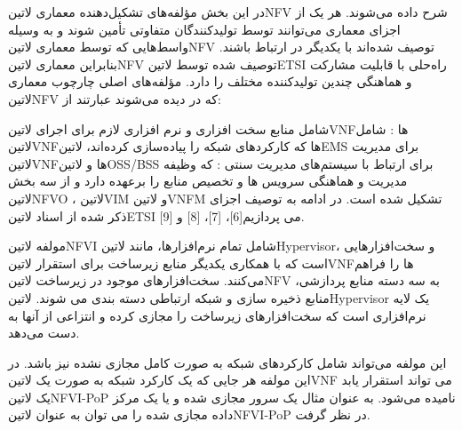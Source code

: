 \documentclass{book}
\begin{document}

در این بخش مؤلفه‌های تشکیل‌دهنده معماری ‌لاتین{NFV} شرح داده می‌شوند.
هر یک از اجزای معماری می‌توانند توسط تولیدکنندگان متفاوتی تأمین شوند و به وسیله واسط‌هایی که توسط معماری ‌لاتین{NFV} توصیف شده‌اند
با یکدیگر در ارتباط باشند.
بنابراین معماری ‌لاتین{NFV} توصیف شده توسط ‌لاتین{ETSI} راه‌حلی با قابلیت مشارکت و هماهنگی چندین تولیدکننده مختلف را دارد.
مؤلفه‌های اصلی چارچوب معماری ‌لاتین{NFV} که در  دیده می‌شوند عبارتند از:

 شامل منابع سخت افزاری و نرم افزاری لازم برای اجرای ‌لاتین{VNF}ها
: شامل ‌لاتین{VNF}ها که کارکردهای شبکه را پیاده‌سازی کرده‌اند، ‌لاتین{EMS} برای مدیریت ‌لاتین{VNF}ها و ‌لاتین{OSS/BSS} برای ارتباط با سیستم‌های مدیریت سنتی
: که وظیفه مدیریت و هماهنگی سرویس ها و تخصیص منابع را برعهده دارد و از سه بخش
‌لاتین{NFVO}
، ‌لاتین{VIM}
و ‌لاتین{VNFM}
تشکیل شده است.
در ادامه به توصیف اجزای ذکر شده از اسناد ‌لاتین{ETSI} می پردازیم[6]، [7]، [8] و [9].

مولفه ‌لاتین{NFVI} شامل تمام نرم‌افزارها، مانند ‌لاتین{Hypervisor}، و سخت‌افزارهایی است که با همکاری یکدیگر منابع زیرساخت برای استقرار ‌لاتین{VNF}ها را فراهم می‌کنند.
سخت‌افزارهای موجود در زیرساخت ‌لاتین{NFV} به سه دسته منابع پردازشی، منابع ذخیره سازی و شبکه ارتباطی دسته بندی می شوند.
‌لاتین{Hypervisor} یک لایه نرم‌افزاری است که سخت‌افزارهای زیرساخت را مجازی کرده و انتزاعی از آن‍ها به دست می‌دهد.

این مولفه می‌تواند شامل کارکردهای شبکه به صورت کامل مجازی نشده نیز باشد.
در این مولفه هر جایی که یک کارکرد شبکه به صورت یک ‌لاتین{VNF} می تواند استقرار یابد یک ‌لاتین{NFVI-PoP} نامیده می‌شود.
به عنوان مثال یک سرور مجازی شده و یا یک مرکز داده مجازی شده را می توان به عنوان ‌لاتین{NFVI-PoP} در نظر گرفت.

\end{document}
